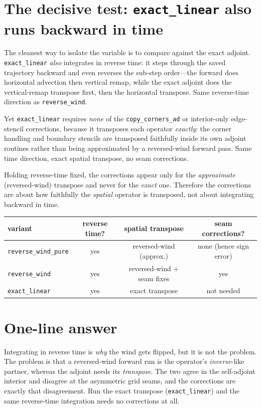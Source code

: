 \documentclass[11pt]{article}
\newcommand{\code}[1]{\texttt{#1}}
\begin{document}
\section{The decisive test: \code{exact\_linear} also runs backward in time}

The cleanest way to isolate the variable is to compare against the exact adjoint.
\code{exact\_linear} \emph{also} integrates in reverse time: it steps through the
saved trajectory backward and even reverses the sub-step order---the forward does
horizontal advection then vertical remap, while the exact adjoint does the
vertical-remap transpose first, then the horizontal transpose. Same reverse-time
direction as \code{reverse\_wind}.

Yet \code{exact\_linear} requires \emph{none} of the \code{copy\_corners\_ad} or
interior-only edge-stencil corrections, because it transposes each operator
\emph{exactly}: the corner handling and boundary stencils are transposed
faithfully inside its own adjoint routines rather than being approximated by a
reversed-wind forward pass. Same time direction, exact spatial transpose, no seam
corrections.

Holding reverse-time fixed, the corrections appear only for the \emph{approximate}
(reversed-wind) transpose and never for the \emph{exact} one. Therefore the
corrections are about how faithfully the \emph{spatial} operator is transposed,
not about integrating backward in time.

\begin{center}
\begin{tabular}{lccc}
\toprule
variant & reverse time? & spatial transpose & seam corrections? \\
\midrule
\code{reverse\_wind\_pure} & yes & reversed-wind (approx.) & none (hence sign error) \\
\code{reverse\_wind}       & yes & reversed-wind $+$ seam fixes & yes \\
\code{exact\_linear}       & yes & exact transpose & not needed \\
\bottomrule
\end{tabular}
\end{center}

\section{One-line answer}

Integrating in reverse time is \emph{why} the wind gets flipped, but it is not the
problem. The problem is that a reversed-wind forward run is the operator's
\emph{inverse}-like partner, whereas the adjoint needs its \emph{transpose}. The
two agree in the self-adjoint interior and disagree at the asymmetric grid seams,
and the corrections are exactly that disagreement. Run the exact transpose
(\code{exact\_linear}) and the same reverse-time integration needs no corrections
at all.
\end{document}
